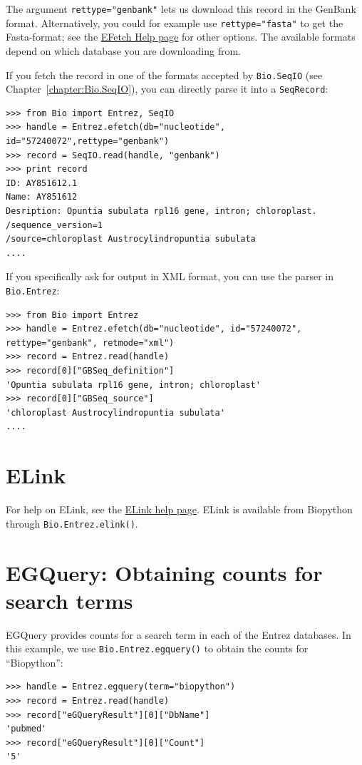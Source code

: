 \documentclass{report}
\begin{document}
The argument \verb+rettype="genbank"+ lets us download this record in the GenBank format. Alternatively, you could for example use \verb+rettype="fasta"+ to get the Fasta-format; see the \href{http://www.ncbi.nlm.nih.gov/entrez/query/static/efetchseq\_help.html}{EFetch Help page} for other options. The available formats depend on which database you are downloading from.

If you fetch the record in one of the formats accepted by \verb+Bio.SeqIO+ (see Chapter~\ref{chapter:Bio.SeqIO}), you can directly parse it into a \verb+SeqRecord+:

\begin{verbatim}
>>> from Bio import Entrez, SeqIO
>>> handle = Entrez.efetch(db="nucleotide", id="57240072",rettype="genbank")
>>> record = SeqIO.read(handle, "genbank")
>>> print record
ID: AY851612.1
Name: AY851612
Desription: Opuntia subulata rpl16 gene, intron; chloroplast.
/sequence_version=1
/source=chloroplast Austrocylindropuntia subulata
....
\end{verbatim}

If you specifically ask for output in XML format, you can use the parser in \verb+Bio.Entrez+:

\begin{verbatim}
>>> from Bio import Entrez
>>> handle = Entrez.efetch(db="nucleotide", id="57240072", rettype="genbank", retmode="xml")
>>> record = Entrez.read(handle)
>>> record[0]["GBSeq_definition"]
'Opuntia subulata rpl16 gene, intron; chloroplast'
>>> record[0]["GBSeq_source"]
'chloroplast Austrocylindropuntia subulata'
....
\end{verbatim}

\section{ELink}
For help on ELink, see the \href{http://www.ncbi.nlm.nih.gov/entrez/query/static/elink\_help.html}{ELink help page}. ELink is available from Biopython through \verb+Bio.Entrez.elink()+.

\section{EGQuery: Obtaining counts for search terms}
EGQuery provides counts for a search term in each of the Entrez databases. In this example, we use \verb+Bio.Entrez.egquery()+ to obtain the counts for ``Biopython'':

\begin{verbatim}
>>> handle = Entrez.egquery(term="biopython") 
>>> record = Entrez.read(handle)
>>> record["eGQueryResult"][0]["DbName"]
'pubmed'
>>> record["eGQueryResult"][0]["Count"]
'5'
\end{verbatim}
\end{document}
